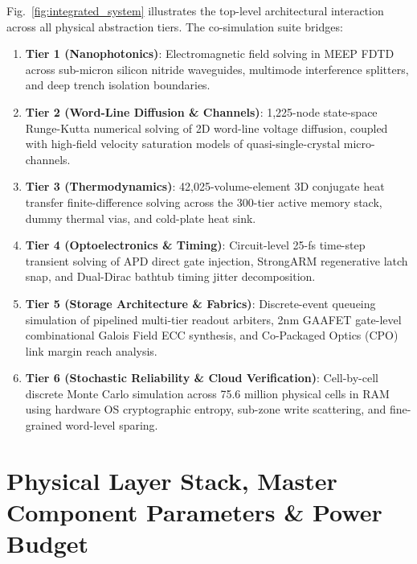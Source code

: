 \documentclass[journal]{IEEEtran}
\begin{document}
Fig.~\ref{fig:integrated_system} illustrates the top-level architectural interaction across all physical abstraction tiers. The co-simulation suite bridges:
\begin{enumerate}
    \item \textbf{Tier 1 (Nanophotonics)}: Electromagnetic field solving in MEEP FDTD across sub-micron silicon nitride waveguides, multimode interference splitters, and deep trench isolation boundaries.
    \item \textbf{Tier 2 (Word-Line Diffusion \& Channels)}: 1,225-node state-space Runge-Kutta numerical solving of 2D word-line voltage diffusion, coupled with high-field velocity saturation models of quasi-single-crystal micro-channels.
    \item \textbf{Tier 3 (Thermodynamics)}: 42,025-volume-element 3D conjugate heat transfer finite-difference solving across the 300-tier active memory stack, dummy thermal vias, and cold-plate heat sink.
    \item \textbf{Tier 4 (Optoelectronics \& Timing)}: Circuit-level 25-fs time-step transient solving of APD direct gate injection, StrongARM regenerative latch snap, and Dual-Dirac bathtub timing jitter decomposition.
    \item \textbf{Tier 5 (Storage Architecture \& Fabrics)}: Discrete-event queueing simulation of pipelined multi-tier readout arbiters, 2nm GAAFET gate-level combinational Galois Field ECC synthesis, and Co-Packaged Optics (CPO) link margin reach analysis.
    \item \textbf{Tier 6 (Stochastic Reliability \& Cloud Verification)}: Cell-by-cell discrete Monte Carlo simulation across 75.6 million physical cells in RAM using hardware OS cryptographic entropy, sub-zone write scattering, and fine-grained word-level sparing.
\end{enumerate}

\section{Physical Layer Stack, Master Component Parameters \& Power Budget}
\label{sec:system_arch}
\end{document}
